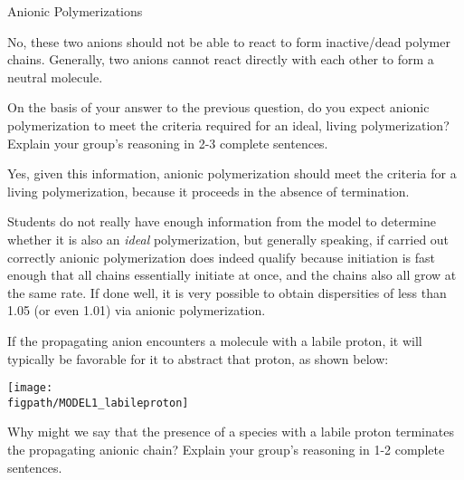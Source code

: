 \begin{activity}{Anionic Polymerizations}
\begin{ctqs}
		\begin{solution}[1.25in]
			No, these two anions should not be able to react to form inactive/dead polymer chains.  Generally, two anions cannot react directly with each other to form a neutral molecule.
		\end{solution}
	
	\question On the basis of your answer to the previous question, do you expect anionic polymerization to meet the criteria required for an ideal, living polymerization?  Explain your group's reasoning in 2-3 complete sentences.
	
		\begin{solution}[1.25in]
			Yes, given this information, anionic polymerization should meet the criteria for a living polymerization, because it proceeds in the absence of termination.
			
			Students do not really have enough information from the model to determine whether it is also an \textit{ideal} polymerization, but generally speaking, if carried out correctly anionic polymerization does indeed qualify because initiation is fast enough that all chains essentially initiate at once, and the chains also all grow at the same rate.  If done well, it is very possible to obtain dispersities of less than 1.05 (or even 1.01) via anionic polymerization.
		\end{solution}

\end{ctqs}

\begin{infobox}

	If the propagating anion encounters a molecule with a labile proton, it will typically be favorable for it to abstract that proton, as shown below:
	
	\centerline{\texttt{[image: \\figpath/MODEL1\_labileproton]}}
	
\end{infobox}

\begin{ctqs}
	
	
	\question Why might we say that the presence of a species with a labile proton terminates the propagating anionic chain?  Explain your group's reasoning in 1-2 complete sentences.
	

\end{ctqs}
\end{activity}
